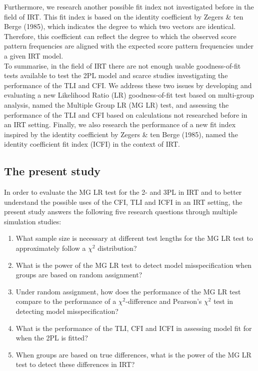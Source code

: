 \documentclass[Royal,sageapa,times,doublespace]{sagej}
\begin{document}
\indent Furthermore, we research another possible fit index not investigated before in the field of IRT. This fit index is based on the identity coefficient by Zegers \& ten Berge (1985), which indicates the degree to which two vectors are identical. Therefore, this coefficient can reflect the degree to which the observed score pattern frequencies are aligned with the expected score pattern frequencies under a given IRT model. \\
\indent To summarise, in the field of IRT there are not enough usable goodness-of-fit tests available to test the 2PL model and scarce studies investigating the performance of the TLI and CFI. We address these two issues by developing and evaluating a new Likelihood Ratio (LR) goodness-of-fit test based on multi-group analysis, named the Multiple Group LR (MG LR) test, and assessing the performance of the TLI and CFI based on calculations not researched before in an IRT setting. Finally, we also research the performance of a new fit index inspired by the identity coefficient by Zegers \& ten Berge (1985), named the identity coefficient fit index (ICFI) in the context of IRT.

\subsection{The present study}
In order to evaluate the MG LR test for the 2- and 3PL in IRT and to better understand the possible uses of the CFI, TLI  and ICFI in an IRT setting, the present study answers the following five research questions through multiple simulation studies:
\begin{enumerate}
\item{What sample size is necessary at different test lengths for the MG LR test to approximately follow a $\chi^2$ distribution?}
\item{What is the power of the MG LR test to detect model misspecification when groups are based on random assignment?}
\item{Under random assignment, how does the performance of the MG LR test compare to the performance of a $\chi^2$-difference and Pearson's $\chi^2$ test in detecting model misspecification?}
\item{What is the performance of the TLI, CFI and ICFI in assessing model fit for when the 2PL is fitted?}
\item{When groups are based on true differences, what is the power of the MG LR test to detect these differences in IRT?}
\end{enumerate}
\end{document}
